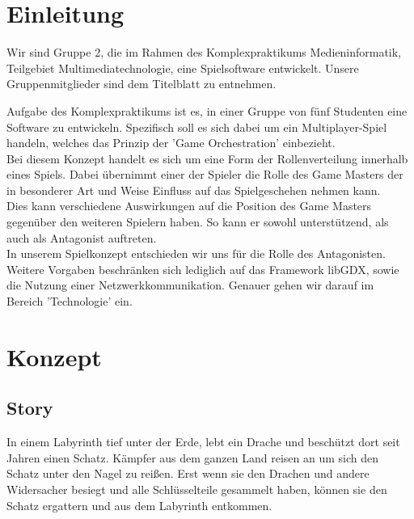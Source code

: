 \documentclass[10pt,a4paper,notitlepage]{scrreprt}
\begin{document}
\begin{flushleft}
\chapter{Einleitung}

Wir sind Gruppe 2, die im Rahmen des Komplexpraktikums Medieninformatik, Teilgebiet Multimediatechnologie, eine Spielsoftware entwickelt. 
Unsere Gruppenmitglieder sind dem Titelblatt zu entnehmen.\

Aufgabe des Komplexpraktikums ist es, in einer Gruppe von fünf Studenten eine Software zu entwickeln.
Spezifisch soll es sich dabei um ein Multiplayer-Spiel handeln, welches das Prinzip der 'Game Orchestration' einbezieht.\\
Bei diesem Konzept handelt es sich um eine Form der Rollenverteilung innerhalb eines Spiels.
Dabei übernimmt einer der Spieler die Rolle des Game Masters der in besonderer Art und Weise Einfluss auf das Spielgeschehen nehmen kann.\\
Dies kann verschiedene Auswirkungen auf die Position des Game Masters gegenüber den weiteren Spielern haben. So kann er sowohl
unterstützend, als auch als Antagonist auftreten.\\
In unserem Spielkonzept entschieden wir uns für die Rolle des Antagonisten.\\
Weitere Vorgaben beschränken sich lediglich auf das Framework libGDX, sowie die Nutzung einer Netzwerkkommunikation. Genauer gehen wir darauf im Bereich 'Technologie' ein.

\chapter{Konzept}

\section{Story}
In einem Labyrinth tief unter der Erde, lebt ein Drache und beschützt dort seit Jahren einen Schatz. Kämpfer aus dem ganzen Land reisen an um sich den Schatz unter den Nagel zu reißen. Erst wenn sie den Drachen und andere Widersacher besiegt und alle Schlüsselteile gesammelt haben, können sie den Schatz ergattern und aus dem Labyrinth entkommen.\\


\end{flushleft}
\end{document}
